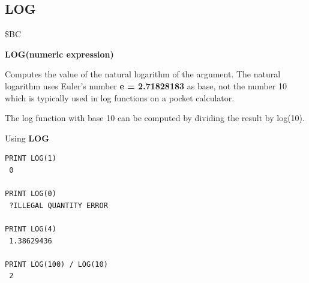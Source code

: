
\newpage
\subsection{LOG}
\begin{description}[leftmargin=2cm,style=nextline]
\item [Token:] \$BC
\item [Format:] {\bf LOG(numeric expression)}
\item [Usage:] Computes
               the value of the natural logarithm of the argument.
               The natural logarithm uses
               Euler's number {\bf e = 2.71828183} as base,
               not the number 10 which is typically used
               in log functions on a pocket calculator.

\item [Remarks:] The log function with base 10 can be computed
                 by dividing the result by log(10).
\item [Example:] Using {\bf LOG}
\begin{tcolorbox}[colback=black,coltext=white]
\verbatimfont{\codefont}
\begin{verbatim}
PRINT LOG(1)
 0

PRINT LOG(0)
 ?ILLEGAL QUANTITY ERROR

PRINT LOG(4)
 1.38629436

PRINT LOG(100) / LOG(10)
 2
\end{verbatim}
\end{tcolorbox}
\end{description}


\newpage
